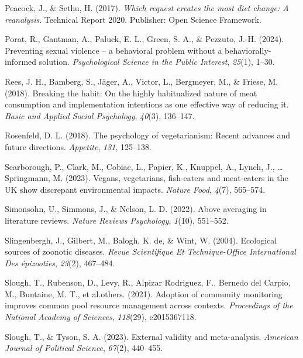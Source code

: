 \documentclass[
  man]{apa6}
\newlength{\cslhangindent}
\newenvironment{CSLReferences}[2] %
 {\begin{list}{}{%
  \setlength{\itemindent}{0pt}
  \setlength{\leftmargin}{0pt}
  \setlength{\parsep}{0pt}
  \ifodd #1
   \setlength{\leftmargin}{\cslhangindent}
   \setlength{\itemindent}{-1\cslhangindent}
  \fi
  \setlength{\itemsep}{#2\baselineskip}}}
 {\end{list}}
\begin{document}
\begin{CSLReferences}{1}{0}
Peacock, J., \& Sethu, H. (2017). \emph{Which request creates the most diet change: A reanalysis}. Technical Report 2020. Publisher: Open Science Framework.

Porat, R., Gantman, A., Paluck, E. L., Green, S. A., \& Pezzuto, J.-H. (2024). Preventing sexual violence -- a behavioral problem without a behaviorally-informed solution. \emph{Psychological Science in the Public Interest}, \emph{25}(1), 1--30.

Rees, J. H., Bamberg, S., Jäger, A., Victor, L., Bergmeyer, M., \& Friese, M. (2018). Breaking the habit: On the highly habitualized nature of meat consumption and implementation intentions as one effective way of reducing it. \emph{Basic and Applied Social Psychology}, \emph{40}(3), 136--147.

Rosenfeld, D. L. (2018). The psychology of vegetarianism: Recent advances and future directions. \emph{Appetite}, \emph{131}, 125--138.

Scarborough, P., Clark, M., Cobiac, L., Papier, K., Knuppel, A., Lynch, J., \ldots{} Springmann, M. (2023). Vegans, vegetarians, fish-eaters and meat-eaters in the UK show discrepant environmental impacts. \emph{Nature Food}, \emph{4}(7), 565--574.

Simonsohn, U., Simmons, J., \& Nelson, L. D. (2022). Above averaging in literature reviews. \emph{Nature Reviews Psychology}, \emph{1}(10), 551--552.

Slingenbergh, J., Gilbert, M., Balogh, K. de, \& Wint, W. (2004). Ecological sources of zoonotic diseases. \emph{Revue Scientifique Et Technique-Office International Des {é}pizooties}, \emph{23}(2), 467--484.

Slough, T., Rubenson, D., Levy, R., Alpizar Rodriguez, F., Bernedo del Carpio, M., Buntaine, M. T., et al.others. (2021). Adoption of community monitoring improves common pool resource management across contexts. \emph{Proceedings of the National Academy of Sciences}, \emph{118}(29), e2015367118.

Slough, T., \& Tyson, S. A. (2023). External validity and meta-analysis. \emph{American Journal of Political Science}, \emph{67}(2), 440--455.


\end{CSLReferences}
\end{document}
